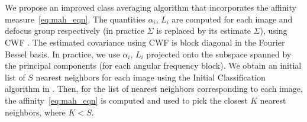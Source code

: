 \documentclass{article}
\begin{document}
We propose an improved class averaging algorithm that incorporates the affinity measure~\eqref{eq:mah_eqn}. The quantities $\alpha_i$, $L_i$ are computed for each image and defocus group respectively (in practice $\Sigma$ is replaced by its estimate $\hat{\Sigma}$), using CWF \cite{cwf}. The estimated covariance using CWF is block diagonal in the Fourier Bessel basis. In practice, we use $\alpha_i$, $L_i$ projected onto the subspace spanned by the principal components (for each angular frequency block). We obtain an initial list of $S$ nearest neighbors for each image using the Initial Classification algorithm in \cite{zhao}. Then, for the list of nearest neighbors corresponding to each image, the affinity~\eqref{eq:mah_eqn} is computed and used to pick the closest $K$ nearest neighbors, where $K<S$. 
%
\end{document}

